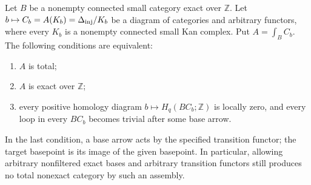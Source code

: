 \begin{theorem}
\label{C4:exact-base-kan-assembly}
Let $B$ be a nonempty connected small category exact over
$\mathbb Z$. Let $b\mapsto C_b=A(K_b)=\Delta_{\rm inj}/K_b$
be a diagram of categories and arbitrary functors, where every
$K_b$ is a nonempty connected small Kan complex. Put
$A=\int_B C_b$. The following conditions are equivalent:
\begin{enumerate}
\item $A$ is total;
\item $A$ is exact over $\mathbb Z$;
\item every positive homology diagram
$b\mapsto H_q(BC_b;\mathbb Z)$ is locally zero, and every
loop in every $BC_b$ becomes trivial after some base arrow.
\end{enumerate}
In the last condition, a base arrow acts by the specified
transition functor; the target basepoint is its image of the
given basepoint. In particular, allowing arbitrary nonfiltered
exact bases and arbitrary transition functors still produces
no total nonexact category by such an assembly.
\end{theorem}
